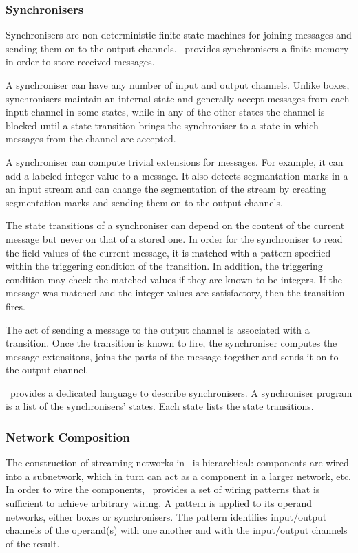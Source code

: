     \subsubsection{Synchronisers}
Synchronisers are non-deterministic finite state machines for joining messages and sending them on to the output channels. \ak\ provides synchronisers a finite memory in order to store received messages.

A synchroniser can have any number of input and output channels. Unlike boxes, synchronisers maintain an internal state and generally accept messages from each input channel in some states, while in any of the other states the channel is blocked until a state transition brings the synchroniser to a state in which messages from the channel are accepted.

A synchroniser can compute trivial extensions for messages. For example, it can add a labeled integer value to a message. It also detects segmantation marks in a an input stream and can change the segmentation of the stream by creating segmentation marks and sending them on to the output channels.

The state transitions of a synchroniser can depend on the content of the current message but never on that of a stored one. In order for the synchroniser to read the field values of the current message, it is matched with a pattern specified within the triggering condition of the transition. In addition, the triggering condition may check the matched values if they are known to be integers. If the message was matched and the integer values are satisfactory, then the transition fires.

The act of sending a message to the output channel is associated with a transition. Once the transition is known to fire, the synchroniser computes the message extensitons, joins the parts of the message together and sends it on to the output channel.

\ak\ provides a dedicated language to describe synchronisers. A synchroniser program is a list of the synchronisers' states. Each state lists the state transitions.


    \subsubsection{Network Composition}
The construction of streaming networks in \ak\ is hierarchical: components are wired into a subnetwork, which in turn can act as a component in a larger network, etc. In order to wire the components, \ak\ provides a set of wiring patterns that is sufficient to achieve arbitrary wiring. A pattern is applied to its operand networks, either boxes or synchronisers. The pattern identifies input/output channels of the operand(s) with one another and with the input/output channels of the result.

